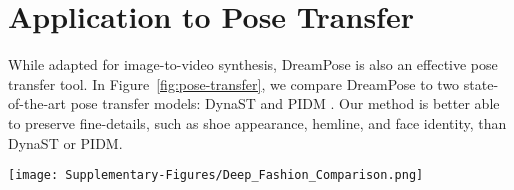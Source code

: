 \section{Application to Pose Transfer}
    While adapted for image-to-video synthesis, DreamPose is also an effective pose transfer tool. In Figure~\ref{fig:pose-transfer}, we compare DreamPose to two state-of-the-art pose transfer models: DynaST \cite{DynaST} and PIDM \cite{pose-transfer-dm}. Our method is better able to preserve fine-details, such as shoe appearance, hemline, and face identity, than DynaST or PIDM. 

        \begin{figure*}[h!]
            \begin{center}
                \texttt{[image: Supplementary-Figures/Deep\_Fashion\_Comparison.png]}
            \end{center}
           \caption{Comparison of Pose Transfer Results. We compare our method to two state-of-the-art pose transfer methods, DynaST \cite{DynaST} and PIDM \cite{pose-transfer-dm}.}
        \label{fig:pose-transfer}
        \end{figure*}

